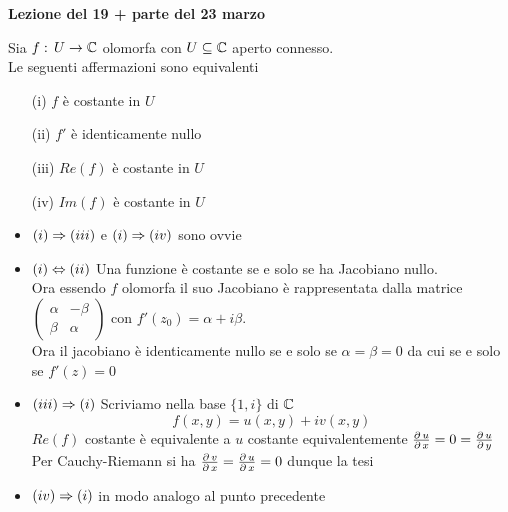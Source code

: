 

\textbf{Lezione del 19 + parte del 23 marzo}
\begin{cor}Sia $f:\, U \to \mathbb{C}$ olomorfa con $U \subseteq \mathbb{C}$ aperto connesso.\\
Le seguenti affermazioni sono equivalenti
\begin{itemize}
\item[(i)] $f$ \`e costante in $U$
\item[(ii)] $f'$ \`e identicamente nullo 
\item[(iii)] $Re(f)$ \`e costante in $U$
\item[(iv)] $Im(f)$ \`e costante in $U$
\end{itemize}
\proof \bbianco
\begin{itemize}
\item $(i) \Rightarrow (iii)$ e $(i) \Rightarrow (iv)$ sono ovvie
\item  $(i)\Leftrightarrow (ii)$ Una funzione \`e costante se e solo se ha Jacobiano nullo.\\
Ora essendo $f$ olomorfa il suo Jacobiano \`e rappresentata dalla matrice  
$\begin{pmatrix}
\alpha & -\beta \\ \beta & \alpha
\end{pmatrix}$ 
con $f'(z_0)=\alpha + i \beta$.\\
Ora il jacobiano \`e identicamente nullo se e solo se $\alpha=\beta =0$ da cui se e solo se $f'(z)=0$
\item $(iii)\Rightarrow (i)$ Scriviamo  nella base $\{ 1, i\}$ di $\mathbb{C}$ 
$$f(x,y)=u(x,y)+i v(x,y)$$ 
$Re(f)$ costante \`e equivalente a $u$ costante equivalentemente
 $\frac{\partial \, u}{\partial\, x} = 0 = \frac{\partial \, u}{\partial\, y} $\\
Per Cauchy-Riemann si ha $\frac{\partial \, v}{\partial\, x} = \frac{\partial \, u}{\partial\, x} = 0 $ dunque la tesi 
\item $(iv)\Rightarrow (i)$ in modo analogo al punto precedente
\end{itemize}
\endproof
\end{cor}
\newpage
